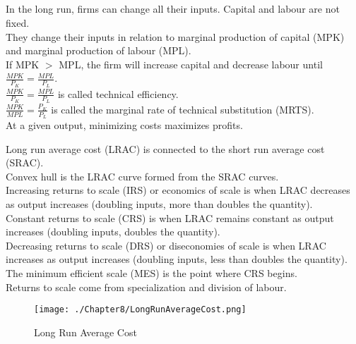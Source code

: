 \subsection{}
In the long run, firms can change all their inputs.
Capital and labour are not fixed.\\
They change their inputs in relation to marginal production of capital (MPK) and marginal production of labour (MPL).\\
If MPK $>$ MPL, the firm will increase capital and decrease labour until $\frac{MPK}{P_K} = \frac{MPL}{P_L}$.\\
$\frac{MPK}{P_K} = \frac{MPL}{P_L}$ is called technical efficiency.\\
$\frac{MPK}{MPL} = \frac{P_K}{P_L}$ is called the marginal rate of technical substitution (MRTS).\\
At a given output, minimizing costs maximizes profits.
\par
Long run average cost (LRAC) is connected to the short run average cost (SRAC).\\
Convex hull is the LRAC curve formed from the SRAC curves.\\
Increasing returns to scale (IRS) or economics of scale is when LRAC decreases as output increases (doubling inputs, more than doubles the quantity).\\
Constant returns to scale (CRS) is when LRAC remains constant as output increases (doubling inputs, doubles the quantity).\\
Decreasing returns to scale (DRS) or diseconomies of scale is when LRAC increases as output increases (doubling inputs, less than doubles the quantity).\\
The minimum efficient scale (MES) is the point where CRS begins.\\
Returns to scale come from specialization and division of labour.
\begin{figure}[H]
\centering
\texttt{[image: ./Chapter8/LongRunAverageCost.png]}
\caption{Long Run Average Cost}
\end{figure}